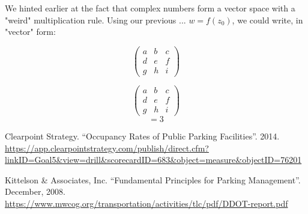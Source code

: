 \documentclass{article}
\begin{document}

We hinted earlier at the fact that complex numbers form a vector space with a "weird" multiplication rule. Using our previous ... $w = f(z_0)$, we could write, in "vector" form:

\[ \left( \begin{array}{ccc}
a & b & c \\
d & e & f \\
g & h & i \end{array} \right)\] 


\[ \left( \begin{array}{ccc}
a & b & c \\
d & e & f \\
g & h & i \end{array} \right)\] \begin{equation} = 3 \end{equation}



\newpage
\begin{thebibliography}{1}

 Clearpoint Strategy. ``Occupancy Rates of Public Parking Facilities''. 2014. \\ \url{https://app.clearpointstrategy.com/publish/direct.cfm?linkID=Goal5&view=drill&scorecardID=683&object=measure&objectID=76201}

 Kittelson \& Associates, Inc. ``Fundamental Principles for Parking Management''. December, 2008. \\ \url{https://www.mwcog.org/transportation/activities/tlc/pdf/DDOT-report.pdf}

\end{thebibliography}
\end{document}
